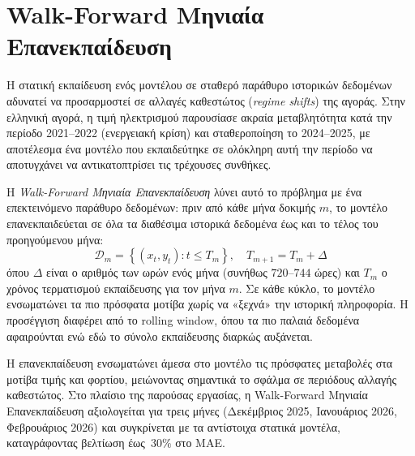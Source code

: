 \section{Walk-Forward Μηνιαία Επανεκπαίδευση}
\label{sec:walk_forward}

Η στατική εκπαίδευση ενός μοντέλου σε σταθερό
παράθυρο ιστορικών δεδομένων αδυνατεί να προσαρμοστεί
σε αλλαγές καθεστώτος (\textit{regime shifts})
της αγοράς. Στην ελληνική αγορά, η τιμή
ηλεκτρισμού παρουσίασε ακραία μεταβλητότητα
κατά την περίοδο 2021–2022 (ενεργειακή κρίση)
και σταθεροποίηση το 2024–2025, με αποτέλεσμα
ένα μοντέλο που εκπαιδεύτηκε σε ολόκληρη
αυτή την περίοδο να αποτυγχάνει να αντικατοπτρίσει
τις τρέχουσες συνθήκες.

Η \emph{Walk-Forward Μηνιαία Επανεκπαίδευση}
λύνει αυτό το πρόβλημα με ένα επεκτεινόμενο
παράθυρο δεδομένων: πριν από κάθε μήνα
δοκιμής $m$, το μοντέλο επανεκπαιδεύεται
σε όλα τα διαθέσιμα ιστορικά δεδομένα έως
και το τέλος του προηγούμενου μήνα:
%
\begin{equation}
  \mathcal{D}_m = \left\{(x_t, y_t) : t \leq T_m\right\},
  \quad T_{m+1} = T_m + \Delta
  \label{eq:walk_forward}
\end{equation}
%
όπου $\Delta$ είναι ο αριθμός των ωρών ενός μήνα
(συνήθως $720$–$744$ ώρες) και $T_m$ ο χρόνος
τερματισμού εκπαίδευσης για τον μήνα $m$.
Σε κάθε κύκλο, το μοντέλο ενσωματώνει τα πιο πρόσφατα μοτίβα χωρίς να «ξεχνά»
την ιστορική πληροφορία. Η προσέγγιση διαφέρει
από το rolling window, όπου τα πιο παλαιά
δεδομένα αφαιρούνται ενώ εδώ το σύνολο εκπαίδευσης
διαρκώς αυξάνεται.

Η επανεκπαίδευση ενσωματώνει άμεσα στο μοντέλο τις πρόσφατες μεταβολές στα μοτίβα τιμής και φορτίου, μειώνοντας σημαντικά το σφάλμα σε περιόδους αλλαγής καθεστώτος.
Στο πλαίσιο της παρούσας εργασίας,
η Walk-Forward Μηνιαία Επανεκπαίδευση αξιολογείται
για τρεις μήνες (Δεκέμβριος 2025, Ιανουάριος 2026,
Φεβρουάριος 2026) και συγκρίνεται με τα αντίστοιχα
στατικά μοντέλα, καταγράφοντας βελτίωση
έως~$30\%$ στο MAE.

